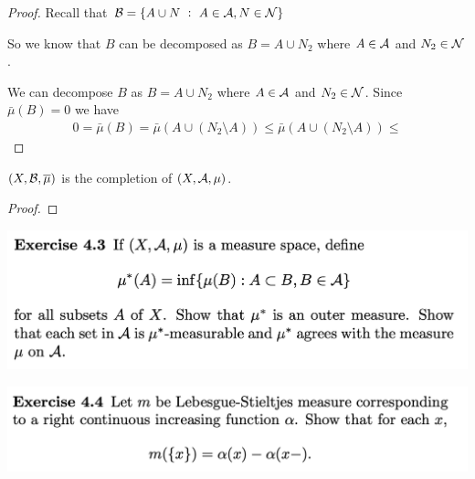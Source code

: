 \begin{proof}
  Recall that $\mathcal B = \{A \cup N ~:~ A \in \mathcal A, N \in \mathcal N\}$

  So we know that $B$ can be decomposed as $B = A \cup N_2$ where $A \in \mathcal A$ and $N_2 \in \mathcal N$.

  We can decompose $B$ as $B = A \cup N_2$ where $A \in \mathcal A$ and $N_2 \in \mathcal N$. Since $\bar\mu(B) = 0$ we
  have
  \begin{align*}
    0 = \bar\mu(B) = \bar\mu(A \cup (N_2 \setminus A)) \leq  \bar\mu(A \cup (N_2 \setminus A)) \leq
  \end{align*}






\end{proof}

\begin{claim*}
  $(X, \mathcal B, \overline{\mu})$ is the completion of $(X, \mathcal A, \mu)$.
\end{claim*}

\begin{proof}

\end{proof}
\newpage
\begin{mdframed}
  \includegraphics[width=400pt]{img/analysis--berkeley-202a-hw-0d98.png}
\end{mdframed}


\newpage
\begin{mdframed}
\includegraphics[width=400pt]{img/analysis--berkeley-202a-hw04-c0b6.png}
\end{mdframed}

\newpage


